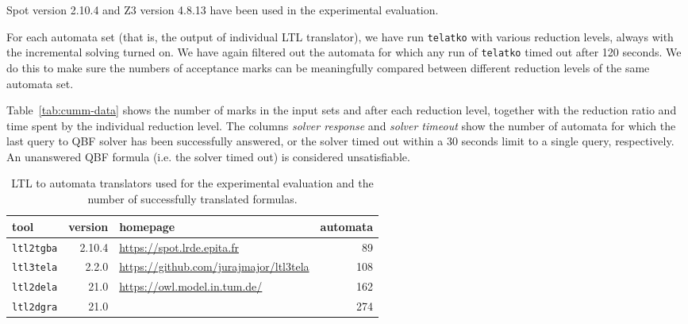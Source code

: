 \documentclass[a4paper,UKenglish,cleveref, autoref, thm-restate]{lipics-v2021}
\newcommand{\telatko}{\texttt{telatko}\xspace}
\begin{document}
Spot version 2.10.4 and Z3 version 4.8.13 have been used in the experimental
evaluation.

For each automata set (that is, the output of individual LTL translator), we
have run \telatko with various reduction levels, always with the incremental
solving turned on. We have again filtered out the automata for which any run
of \telatko timed out after 120 seconds. We do this to make sure the numbers
of acceptance marks can be meaningfully compared between different reduction
levels of the same automata set.

Table~\ref{tab:cumm-data} shows the number of marks in the input sets and after
each reduction level, together with the reduction ratio and time spent by the
individual reduction level. The columns \textit{solver response} and
\textit{solver timeout} show the number of automata for which the last query to
QBF solver has been successfully answered, or the solver timed out within a 30
seconds limit to a single query, respectively. An unanswered QBF formula (i.e.
the solver timed out) is considered unsatisfiable.

\begin{table}[h]
\caption{LTL to automata translators used for the experimental evaluation
and the number of successfully translated formulas.}
\label{tab:ltltranslators}
\centering
\begin{tabular}{lr@{~~~}lr}
\toprule
tool        & version&homepage & automata \\
\midrule
\texttt{ltl2tgba} & 2.10.4 & \url{https://spot.lrde.epita.fr} & 89\\
\texttt{ltl3tela} & 2.2.0  & \url{https://github.com/jurajmajor/ltl3tela} & 108\\
\texttt{ltl2dela} & 21.0 & \multirow{2}{*}{\url{https://owl.model.in.tum.de/}} & 162\\
\texttt{ltl2dgra} & 21.0 & & 274\\
\bottomrule
\end{tabular}
\end{table}

\begin{table}[h]
\caption{The cummulative number of acceptance marks before and after reduction
for various automata sets. \textit{X/Y solved aut.} means that out of
\textit{Y} successfully translated LTL formulas, every run of \telatko ended
within 120 seconds time limit on \textit{X} automata. We sum up the acceptance
marks only on these automata. The columns \textit{solver response} and
\textit{solver timeout} refer to last call to the QBF solver (that is, the
numbers of its successful responses within 30 seconds limit and timeouts).
}
\label{tab:cumm-data}
\centering

\end{table}
\end{document}
